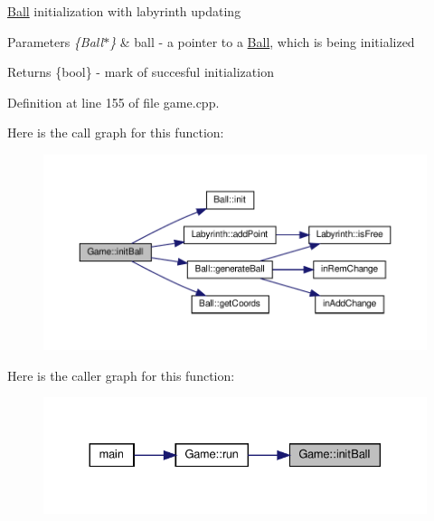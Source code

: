 \mbox{\hyperlink{class_ball}{Ball}} initialization with labyrinth updating 
\begin{DoxyParams}{Parameters}
{\em \{\+Ball$\ast$\}} & ball -\/ a pointer to a \mbox{\hyperlink{class_ball}{Ball}}, which is being initialized \\
\hline
\end{DoxyParams}
\begin{DoxyReturn}{Returns}
\{bool\} -\/ mark of succesful initialization 
\end{DoxyReturn}


Definition at line 155 of file game.\+cpp.

Here is the call graph for this function\+:
\nopagebreak
\begin{figure}[H]
\begin{center}
\leavevmode
\includegraphics[width=350pt]{class_game_a3702238c3fef205d19d1cb4bbc471c5c_cgraph}
\end{center}
\end{figure}
Here is the caller graph for this function\+:
\nopagebreak
\begin{figure}[H]
\begin{center}
\leavevmode
\includegraphics[width=330pt]{class_game_a3702238c3fef205d19d1cb4bbc471c5c_icgraph}
\end{center}
\end{figure}
\mbox{\label{class_game_a0e8435182e77e921b5ba0471a8bfb20d}} 
